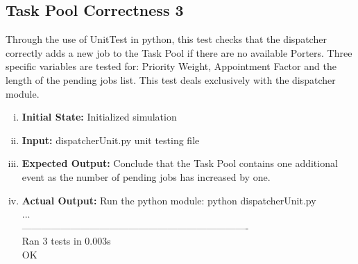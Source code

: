 \documentclass[paper=letter, fontsize=10pt]{scrartcl}
\numberwithin{equation}{section}		%
\numberwithin{figure}{section}			%
\numberwithin{table}{section}				%
\begin{document}
\begin{enumerate}[(i)]
\subsection{Task Pool Correctness 3}
Through the use of UnitTest in python, this test checks that the dispatcher correctly adds a new job to the Task Pool if there are no available Porters. Three specific variables are tested for: Priority Weight, Appointment Factor and the length of the pending jobs list. This test deals exclusively with the dispatcher module.
\begin{enumerate}[(i)]
	\item \textbf{Initial State:} Initialized simulation
	\item \textbf{Input:} dispatcherUnit.py unit testing file %
	\item \textbf{Expected Output:} Conclude that the Task Pool contains one additional event as the number of pending jobs has increased by one.
	\item \textbf{Actual Output:} Run the python module: python dispatcherUnit.py\\
...\\
----------------------------------------------------------------------\\
Ran 3 tests in 0.003s\\

OK
\end{enumerate}


\end{enumerate}
\end{document}
